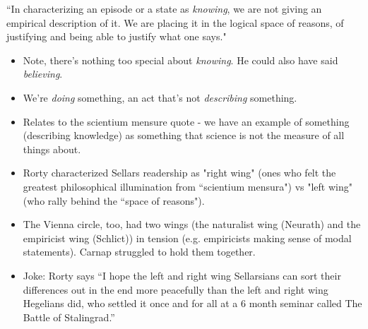``In characterizing an episode or a state as \emph{knowing}, we are not giving an empirical description of it. We are placing it in the logical space of reasons, of justifying and being able to justify what one says." \cite{sellars1956empiricism}
    \begin{itemize}
        \item Note, there's nothing too special about \emph{knowing}. He could also have said \emph{believing}.
        \item  We're \emph{doing} something, an act that's not \emph{describing} something.
        \item Relates to the scientium mensure quote - we have an example of something (describing knowledge) as something that science is not the measure of all things about.
        \item Rorty characterized Sellars readership as "right wing" (ones who felt the greatest philosophical illumination from ``scientium mensura") vs "left wing" (who rally behind the ``space of reasons").
        \item The Vienna circle, too, had two wings (the naturalist wing (Neurath) and the empiricist wing (Schlict)) in tension (e.g. empiricists making sense of modal statements). Carnap struggled to hold them together.
        \item Joke: Rorty says ``I hope the left and right wing Sellarsians can sort their differences out in the end more peacefully than the left and right wing Hegelians did, who settled it once and for all at a 6 month seminar called The Battle of Stalingrad.''
    \end{itemize}